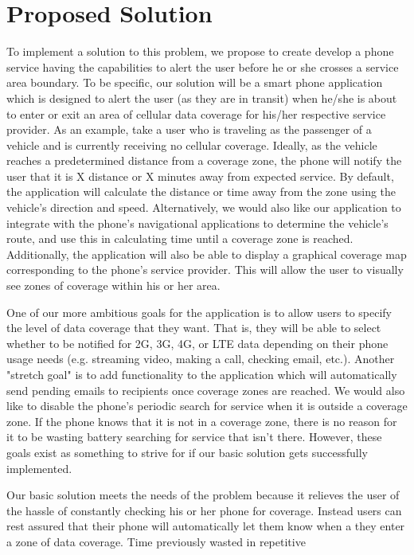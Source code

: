 \documentclass[letterpaper,10pt,draftclsnofoot,onecolumn]{IEEEtran}
\begin{document}
\section*{Proposed Solution}
To implement a solution to this problem, we propose to create develop a phone
service having the capabilities to alert the user before he or she
crosses a service area boundary. To be specific, our solution will be a smart
phone application which is designed to alert the user (as they are in transit)
when he/she is about to enter or exit an area of cellular data coverage for
his/her respective service provider. As an example, take a user who is traveling
as the passenger of a vehicle and is currently receiving no cellular coverage.
Ideally, as the vehicle reaches a predetermined distance from a coverage zone,
the phone will notify the user that it is X distance or X minutes away from
expected service. By default, the application will calculate the distance or
time away from the zone using the vehicle's direction and speed. Alternatively,
we would also like our application to integrate with the phone's navigational
applications to determine the vehicle's route, and use this in calculating time
until a coverage zone is reached. Additionally, the application will also be
able to display a graphical coverage map corresponding to the phone's service
provider. This will allow the user to visually see zones of coverage within his
or her area.\par
One of our more ambitious goals for the application is to allow users to specify
the level of data coverage that they want. That is, they will be able to select
whether to be notified for 2G, 3G, 4G, or LTE data depending on their phone
usage needs (e.g. streaming video, making a call, checking email, etc.). Another
"stretch goal" is to add functionality to the application which will
automatically send pending emails to recipients once coverage zones are reached.
We would also like to disable the phone's periodic search for service when it is
outside a coverage zone. If the phone knows that it is not in a coverage zone,
there is no reason for it to be wasting battery searching for service that isn't
there. However, these goals exist as something to strive for if our basic
solution gets successfully implemented.\par
Our basic solution meets the needs of the problem because it relieves the user
of the hassle of constantly checking his or her phone for coverage. Instead
users can rest assured that their phone will automatically let them know when a
they enter a zone of data coverage. Time previously wasted in repetitive
\end{document}
